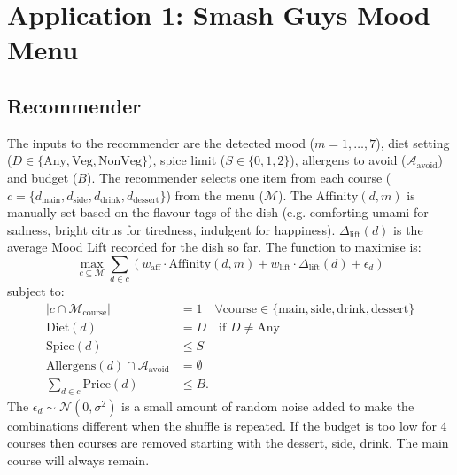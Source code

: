 \documentclass[conference]{IEEEtran}
\begin{document}
\section{Application 1: Smash Guys Mood Menu}
\subsection{Recommender}
The inputs to the recommender are the detected mood ($m=1,\dots,7$), diet setting ($D \in \{\text{Any}, \text{Veg}, \text{NonVeg}\}$), spice limit ($S \in \{0, 1, 2\}$), allergens to avoid ($\mathcal{A}_{\text{avoid}}$) and budget ($B$). The recommender selects one item from each course ($c = \{d_{\text{main}}, d_{\text{side}}, d_{\text{drink}}, d_{\text{dessert}}\}$) from the menu ($\mathcal{M}$). The $\text{Affinity}(d, m)$ is manually set based on the flavour tags of the dish (e.g. comforting umami for sadness, bright citrus for tiredness, indulgent for happiness). $\Delta_{\text{lift}}(d)$ is the average Mood Lift recorded for the dish so far. The function to maximise is:
\begin{equation}
\max_{c \subseteq \mathcal{M}} \sum_{d \in c} \left( w_{\text{aff}} \cdot \text{Affinity}(d, m) + w_{\text{lift}} \cdot \Delta_{\text{lift}}(d) + \epsilon_d \right)
\end{equation}
subject to:
\begin{align}
|c \cap \mathcal{M}_{\text{course}}| &= 1 \quad \forall \text{course} \in \{\text{main}, \text{side}, \text{drink}, \text{dessert}\} \\
\text{Diet}(d) &= D \quad \text{if } D \neq \text{Any} \\
\text{Spice}(d) &\le S \\
\text{Allergens}(d) \cap \mathcal{A}_{\text{avoid}} &= \emptyset \\
\sum_{d \in c} \text{Price}(d) &\le B.
\end{align}
The $\epsilon_d \sim \mathcal{N}(0, \sigma^2)$ is a small amount of random noise added to make the combinations different when the shuffle is repeated. If the budget is too low for 4 courses then courses are removed starting with the dessert, side, drink. The main course will always remain.
\end{document}
